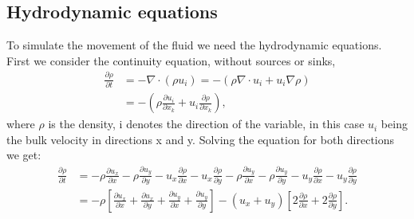 \documentclass[a4paper,10pt]{article}
\begin{document}
\subsection{Hydrodynamic equations}
To simulate the movement of the fluid we need the hydrodynamic equations. First we consider the continuity equation, without sources or sinks, 
%
\begin{align}\label{eq:cons_mass}
\frac{\partial \rho}{\partial t} &= -\nabla \cdot \left(\rho u_i\right) = -\left(\rho \nabla \cdot u_i + u_i\nabla \rho\right) \nonumber \\
&= -\left(\rho \frac{\partial u_i}{\partial x_k} + u_i \frac{\partial \rho}{\partial x_k}\right),
\end{align}
%
where $\rho$ is the density, i denotes the direction of the variable, in this case $u_i$ being the bulk velocity in directions x and y. Solving the equation for both directions we get:
%
\begin{align}
\frac{\partial \rho}{\partial t} &= -\rho\frac{\partial u_x}{\partial x} - \rho \frac{\partial u_y}{\partial y} - u_x\frac{\partial \rho}{\partial x} - u_x\frac{\partial \rho}{\partial y} \nonumber -  \rho\frac{\partial u_y}{\partial x} - \rho \frac{\partial u_y}{\partial y} - u_y \frac{\partial \rho}{\partial x} - u_y \frac{\partial \rho}{\partial y} \nonumber \\
&= -\rho\left[\frac{\partial u_x}{\partial x} + \frac{\partial u_x}{\partial y} + \frac{\partial u_y}{\partial x} + \frac{\partial u_y}{\partial y}\right] - \left(u_x + u_y\right)\left[2\frac{\partial \rho}{\partial x} + 2\frac{\partial \rho}{\partial y}\right].
\end{align}
\end{document}
